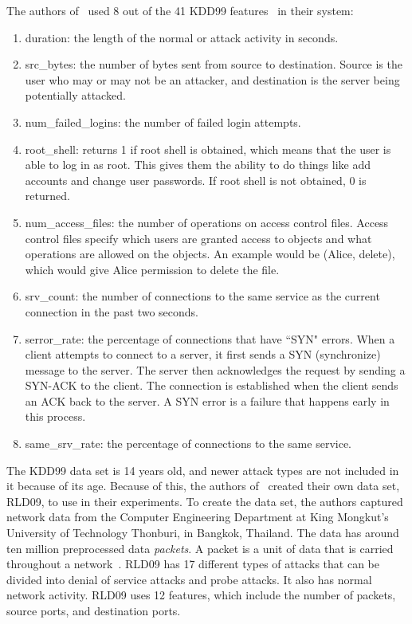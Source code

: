 \documentclass{sig-alternate}
\begin{document}
The authors of~\cite{6496342, 6559603} used 8 out of the 41 KDD99 features~\cite{KDD99} in their system: 
\begin{enumerate}
  \item duration: the length of the normal or attack activity in seconds.
  \item src\_bytes: the number of bytes sent from source to destination. Source is the user who may or may not be an attacker, and destination is the server being potentially attacked.
  \item num\_failed\_logins: the number of failed login attempts.
  \item root\_shell: returns 1 if root shell is obtained, which means that the user is able to log in as root. This gives them the ability to do things like add accounts and change user passwords. If root shell is not obtained, 0 is returned.
  \item num\_access\_files: the number of operations on access control files. Access control files specify which users are granted access to objects and what operations are allowed on the objects. An example would be (Alice, delete), which would give Alice permission to delete the file.~\cite{accessControl}
  \item srv\_count: the number of connections to the same service as the current connection in the past two seconds.
  \item serror\_rate: the percentage of connections that have ``SYN" errors. When a client attempts to connect to a server, it first sends a SYN (synchronize) message to the server. The server then acknowledges the request by sending a SYN-ACK to the client. The connection is established when the client sends an ACK back to the server. A SYN error is a failure that happens early in this process.~\cite{TCP}
  \item same\_srv\_rate: the percentage of connections to the same service.
\end{enumerate}

The KDD99 data set is 14 years old, and newer attack types are not included in it because of its age. Because of this, the authors of~\cite{6496342, 6559603} created their own data set, RLD09, to use in their experiments. To create the data set, the authors captured network data from the Computer Engineering Department at King Mongkut's University of Technology Thonburi, in Bangkok, Thailand. The data has around ten million preprocessed data \emph{packets}. A packet is a unit of data that is carried throughout a network~\cite{networkPacket}. RLD09 has 17 different types of attacks that can be divided into denial of service attacks and probe attacks. It also has normal network activity. RLD09 uses 12 features, which include the number of packets, source ports, and destination ports.
\end{document}
